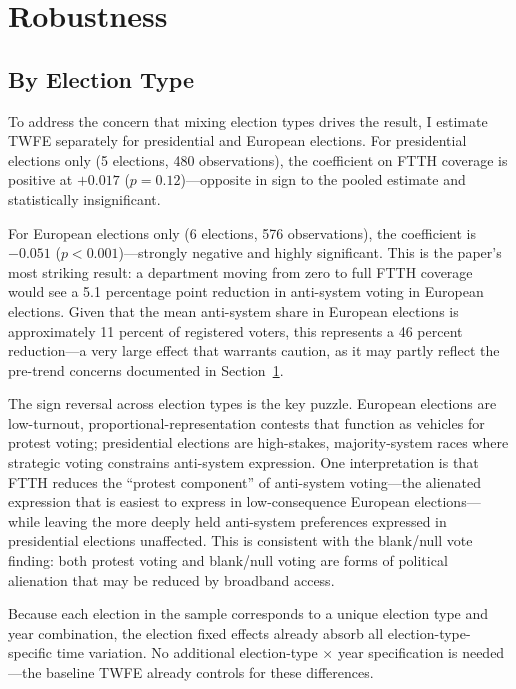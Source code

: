 \documentclass[12pt]{article}
\begin{document}
\section{Robustness}\label{sec:robustness}

\subsection{By Election Type}

To address the concern that mixing election types drives the result, I estimate TWFE separately for presidential and European elections. For presidential elections only (5 elections, 480 observations), the coefficient on FTTH coverage is positive at $+0.017$ ($p = 0.12$)---opposite in sign to the pooled estimate and statistically insignificant.

For European elections only (6 elections, 576 observations), the coefficient is $-0.051$ ($p < 0.001$)---strongly negative and highly significant. This is the paper's most striking result: a department moving from zero to full FTTH coverage would see a 5.1 percentage point reduction in anti-system voting in European elections. Given that the mean anti-system share in European elections is approximately 11 percent of registered voters, this represents a 46 percent reduction---a very large effect that warrants caution, as it may partly reflect the pre-trend concerns documented in Section~\ref{sec:robustness}.

The sign reversal across election types is the key puzzle. European elections are low-turnout, proportional-representation contests that function as vehicles for protest voting; presidential elections are high-stakes, majority-system races where strategic voting constrains anti-system expression. One interpretation is that FTTH reduces the ``protest component'' of anti-system voting---the alienated expression that is easiest to express in low-consequence European elections---while leaving the more deeply held anti-system preferences expressed in presidential elections unaffected. This is consistent with the blank/null vote finding: both protest voting and blank/null voting are forms of political alienation that may be reduced by broadband access.

Because each election in the sample corresponds to a unique election type and year combination, the election fixed effects already absorb all election-type-specific time variation. No additional election-type $\times$ year specification is needed---the baseline TWFE already controls for these differences.
\end{document}
